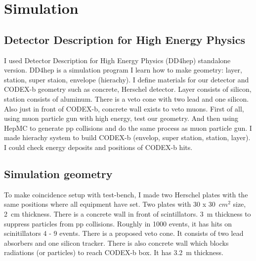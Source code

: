 \section{Simulation}
\label{sec:Simulation}

\subsection{Detector Description for High Energy Physics}
I used Detector Description for High Energy Physics (DD4hep) standalone version.
DD4hep is a simulation program 
I learn how to make geometry: layer, station, super staion, envelope (hierachy).
I define materials for our detector and CODEX-b geometry such as concrete, Herschel detector.
Layer consists of silicon, station consists of aluminum. 
There is a veto cone with two lead and one silicon. 
Also just in front of CODEX-b, concrete wall exists to veto muons.
First of all, using muon particle gun with high energy, test our geometry.
And then using HepMC to generate pp collisions and do the same process as muon particle gun.
I made hierachy system to build CODEX-b (envelop, super station, station, layer).
I could check energy deposits and positions of CODEX-b hits.


\subsection{Simulation geometry}
To make coincidence setup with test-bench, I made two Herschel plates with the same positions where all equipment have set.
Two plates with 30 x 30~$cm^{2}$ size, 2~cm thickness.
There is a concrete wall in front of scintillators.
3~m thickness to suppress particles from pp collisions.
Roughly in 1000 events, it has hits on scinitillators 4 - 9 events.
There is a proposed veto cone. It consists of two lead absorbers and one silicon tracker.
There is also concrete wall which blocks radiations (or particles) to reach CODEX-b box. 
It has 3.2~m thickness.




